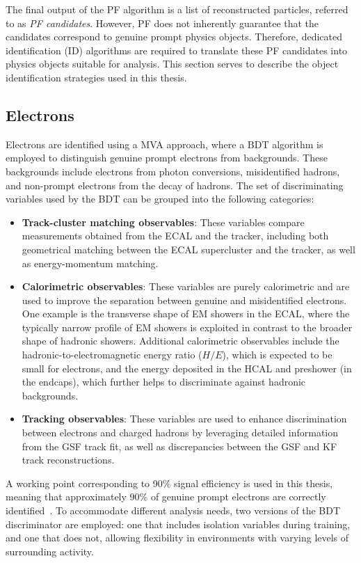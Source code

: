 The final output of the PF algorithm is a list of reconstructed particles, referred to as \textit{PF candidates}. However, PF does not inherently guarantee that the candidates correspond to genuine prompt physics objects. Therefore, dedicated identification (ID) algorithms are required to translate these PF candidates into physics objects suitable for analysis. This section serves to describe the object identification strategies used in this thesis.

\subsection{Electrons}

Electrons are identified using a \ac{MVA} approach, where a \ac{BDT} algorithm is employed to distinguish genuine prompt electrons from backgrounds. These backgrounds include electrons from photon conversions, misidentified hadrons, and non-prompt electrons from the decay of hadrons. The set of discriminating variables used by the BDT can be grouped into the following categories:

\begin{itemize}
    \item \textbf{Track-cluster matching observables}: These variables compare measurements obtained from the ECAL and the tracker, including both geometrical matching between the ECAL supercluster and the tracker, as well as energy-momentum matching.
    \item \textbf{Calorimetric observables}: These variables are purely calorimetric and are used to improve the separation between genuine and misidentified electrons. One example is the transverse shape of EM showers in the ECAL, where the typically narrow profile of EM showers is exploited in contrast to the broader shape of hadronic showers. Additional calorimetric observables include the hadronic-to-electromagnetic energy ratio ($H/E$), which is expected to be small for electrons, and the energy deposited in the HCAL and preshower (in the endcaps), which further helps to discriminate against hadronic backgrounds.
    \item \textbf{Tracking observables}: These variables are used to enhance discrimination between electrons and charged hadrons by leveraging detailed information from the GSF track fit, as well as discrepancies between the GSF and KF track reconstructions.
\end{itemize}

A working point corresponding to 90\% signal efficiency is used in this thesis, meaning that approximately 90\% of genuine prompt electrons are correctly identified~\cite{ElectronID_Performance}. To accommodate different analysis needs, two versions of the BDT discriminator are employed: one that includes isolation variables during training, and one that does not, allowing flexibility in environments with varying levels of surrounding activity. 

